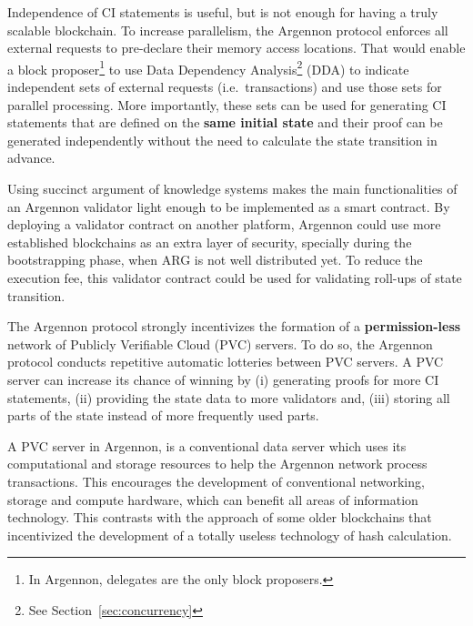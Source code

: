 Independence of CI statements is useful, but is not enough for having a truly scalable blockchain. To increase
parallelism, the Argennon protocol enforces all external requests to pre-declare their memory access locations. That
would enable a block proposer\footnote{In Argennon, delegates are the only block proposers.} to use Data Dependency
Analysis\footnote{See Section~\ref{sec:concurrency}} (DDA) to indicate independent sets of external requests (i.e.\
transactions) and use those sets for parallel processing. More importantly, these sets can be used for generating CI
statements that are defined on the \textbf{same initial state} and their proof can be generated independently without
the need to calculate the state transition in advance.

Using succinct argument of knowledge systems makes the main functionalities of an Argennon validator light enough to
be implemented as a smart contract. By deploying a validator contract on another platform, Argennon
could use more established blockchains as an extra layer of security, specially
during the bootstrapping phase, when ARG is not well distributed yet. To reduce the execution fee, this validator
contract could be used for validating roll-ups of state transition.

The Argennon protocol strongly incentivizes the formation of a \textbf{permission-less} network of Publicly Verifiable
Cloud (PVC) servers. To do so, the Argennon protocol conducts repetitive automatic lotteries between PVC servers.
A PVC server can increase its chance of winning by (i) generating proofs for more CI statements, (ii) providing the
state data to more validators and, (iii) storing all parts of the state instead of more frequently used parts.

A PVC server in Argennon, is a conventional data server which uses its computational and
storage resources to help the Argennon network process transactions. This encourages the development
of conventional networking, storage and compute hardware, which can benefit all areas of information technology.
This contrasts with the approach of some older blockchains that incentivized the development of a totally
useless technology of hash calculation.
